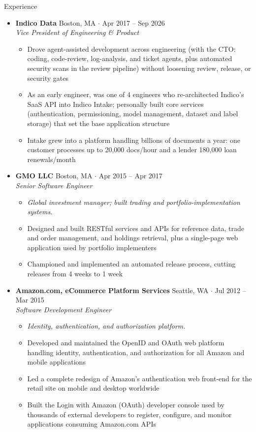 \documentclass[10pt,oneside]{article}
\newenvironment{ressection}[1]{
  \vspace{4pt}
  {\fontfamily{phv}\selectfont\Large#1}
  \begin{itemize}
    \vspace{3pt}
}{
  \end{itemize}
}
\newcommand{\ressubitem}[1]{
  \vspace{-1pt}
\item \begin{flushleft} #1 \end{flushleft}
}
\newcommand{\rescontext}[1]{
  \vspace{-3pt}
\item[] \begin{flushleft} \textit{\small #1} \end{flushleft}
}
\newcommand{\resbigitem}[3]{
  \vspace{-5pt}
\item
  \textbf{#1} \hfill #2 \\
  \textit{#3}
}
\newenvironment{ressubsec}[3]{
  \resbigitem{#1}{#2}{#3}
  \vspace{-2pt}
  \begin{itemize}
}{
  \end{itemize}
}
\begin{document}
\begin{ressection}{Experience}
\begin{ressubsec}{Indico Data}{Boston, MA \; $\cdot$ \; Apr 2017 -- Sep 2026}{Vice President of Engineering \& Product}
    \ressubitem{Drove agent-assisted development across engineering (with the CTO: coding, code-review, log-analysis, and ticket agents, plus automated security scans in the review pipeline) without loosening review, release, or security gates}
    \ressubitem{As an early engineer, was one of 4 engineers who re-architected Indico's SaaS API into Indico Intake; personally built core services (authentication, permissioning, model management, dataset and label storage) that set the base application structure}
    \ressubitem{Intake grew into a platform handling billions of documents a year: one customer processes up to 20{,}000 docs/hour and a lender 180{,}000 loan renewals/month}
  \end{ressubsec}

  \begin{ressubsec}{GMO LLC}{Boston, MA \; $\cdot$ \; Apr 2015 -- Apr 2017}{Senior Software Engineer}
    \rescontext{Global investment manager; built trading and portfolio-implementation systems.}
    \ressubitem{Designed and built RESTful services and APIs for reference data, trade and order management, and holdings retrieval, plus a single-page web application used by portfolio implementers}
    \ressubitem{Championed and implemented an automated release process, cutting releases from 4 weeks to 1 week}
  \end{ressubsec}

  \begin{ressubsec}{Amazon.com, eCommerce Platform Services}{Seattle, WA \; $\cdot$ \; Jul 2012 -- Mar 2015}{Software Development Engineer}
    \rescontext{Identity, authentication, and authorization platform.}
    \ressubitem{Developed and maintained the OpenID and OAuth web platform handling identity, authentication, and authorization for all Amazon and mobile applications}
    \ressubitem{Led a complete redesign of Amazon's authentication web front-end for the retail site on mobile and desktop worldwide}
    \ressubitem{Built the Login with Amazon (OAuth) developer console used by thousands of external developers to register, configure, and monitor applications consuming Amazon.com APIs}
  \end{ressubsec}

\end{ressection}
\end{document}
